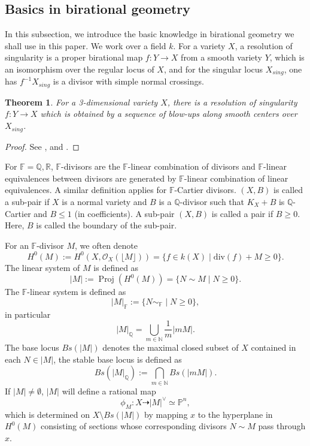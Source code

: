 \documentclass[letterpaper,reqno,12pt]{amsart}
\DeclareMathOperator{\Proj}{Proj}
\numberwithin{equation}{section}
\theoremstyle{plain}
\newtheorem{theorem}{Theorem}[section]
\begin{document}
\subsection{Basics in birational geometry}
In this subsection,  we introduce the basic knowledge in birational geometry we shall use in this paper. We work over a field $k$. For a variety $X$, a resolution of singularity is a proper birational map $f:Y\to X$ from a smooth variety $Y$, which is an isomorphism over the regular locus of $X$, and for the singular locus $X_{sing}$, one has $f^{-1}X_{sing}$ is a divisor with simple normal crossings. 
\begin{theorem}
    For a 3-dimensional variety $X$, there is a resolution of singularity $f:Y\to X$ which is obtained by a sequence of blow-ups along smooth centers over $X_{sing}$.
\end{theorem}
\begin{proof}
    See \cite{Cutkosky2004ResolutionOS}, \cite{Cossart2008ResolutionOS} and \cite{Cossart2009RESOLUTIONOS}.
\end{proof} 

For $\mathbb F=\mathbb Q,\mathbb R$, $\mathbb F$-divisors are the $\mathbb F$-linear combination of divisors and $\mathbb F$-linear equivalences between divisors are generated by $\mathbb F$-linear combination of linear equivalences. A similar definition applies for $\mathbb F$-Cartier divisors. $(X,B)$ is called a sub-pair if $X$ is a normal variety and $B$ is a $\mathbb Q$-divisor such that $K_X+B$ is $\mathbb Q$-Cartier and $B\leq 1$ (in coefficients).  A sub-pair $(X,B)$ is called a pair if $B\geq 0$. Here, $B$ is called the boundary of the sub-pair.

For an $\mathbb F$-divisor $M$, we often denote \[H^0(M):=H^0(X,\mathcal O_X(\lfloor M\rfloor))=\{f\in k(X)\mid\text{div}(f)+M\geq 0\}.\] The linear system of $M$ is defined as  \[|M|:=\Proj(H^0(M))=\{N\sim M\mid N\geq0\}.\] The $\mathbb F$-linear system is defined as \[|M|_{\mathbb F}:=\{N\sim_{\mathbb F}\mid N\geq0\},\]in particular \[|M|_{\mathbb Q}=\bigcup\limits_{m\in\mathbb N} \frac{1}{m}|mM|.\]The base locus $Bs(|M|)$ denotes the maximal closed subset of $X$ contained in each $N\in|M|$, the stable base locus is defined as \[Bs(|M|_{\mathbb Q}):=\bigcap\limits_{m\in\mathbb N} Bs(|mM|).\] If $|M|\neq\emptyset$, $|M|$ will define a rational map \[\phi_M:X\dashrightarrow |M|^\lor\simeq \mathbb P^n,\] which is determined on $X\setminus Bs(|M|)$ by mapping $x$ to the hyperplane in $H^0(M)$ consisting of sections whose corresponding divisors $N\sim M$ pass through $x$. 
\end{document}
